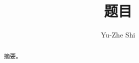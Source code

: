 \documentclass[fontset=fandol]{ctexrep}
\title{题目}
\author{Yu-Zhe Shi}
\begin{document}
\newtheorem{proof}{\hspace{2em}Proof}
\newtheorem{lemma}{\hspace{2em}Lemma}
\newtheorem{definition}{\hspace{2em}Definition}
\newtheorem{proposition}{\hspace{2em}Proposition}
\maketitle
\begin{abstract}
    摘要。
\end{abstract}
\end{document}

